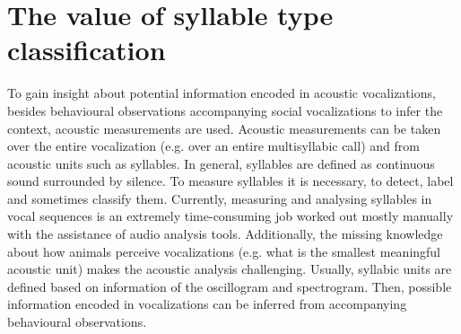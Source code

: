 \section{The value of syllable type classification}\label{sec:syllable_classification}
To gain insight about potential information encoded in acoustic vocalizations, besides behavioural observations accompanying social vocalizations to infer the context, acoustic measurements are used.
Acoustic measurements can be taken over the entire vocalization (e.g. over an entire multisyllabic call) and from acoustic units such as syllables. In general, syllables are defined as continuous sound surrounded by silence.
To measure syllables it is necessary, to detect, label and sometimes classify them.
Currently, measuring and analysing syllables in vocal sequences is an extremely time-consuming job worked out mostly manually with the assistance of audio analysis tools.
Additionally, the missing knowledge about how animals perceive vocalizations (e.g. what is the smallest meaningful acoustic unit) makes the acoustic analysis challenging. Usually, syllabic units are defined based on information of the oscillogram and spectrogram. Then, possible information encoded in vocalizations can be inferred from accompanying behavioural observations.


